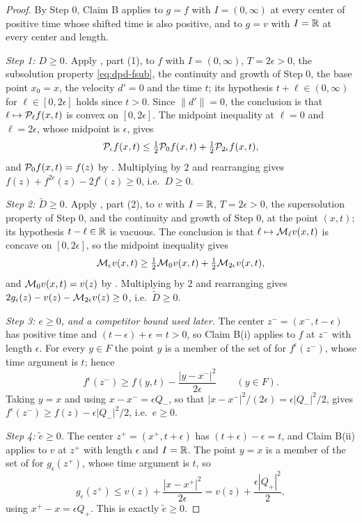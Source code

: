 \begin{proof}
By Step 0, Claim B applies to $g=f$ with $I=(0,\infty)$ at every center of
positive time whose shifted time is also positive, and to $g=v$ with $I=\mathbb{R}$ at
every center and length.

\emph{Step 1: $D\ge0$.}
Apply , part (1), to $f$ with $I=(0,\infty)$,
$T=2\epsilon>0$, the subsolution property \eqref{eq:dpd-fsub}, the continuity
and growth of Step 0, the base point $x_0=x$, the velocity $d'=0$ and the time
$t$; its hypothesis $t+\ell\in(0,\infty)$ for $\ell\in[0,2\epsilon]$ holds since
$t>0$. Since $\|d'\|=0$, the conclusion is that
$\ell\mapsto\mathcal{P}_\ell f(x,t)$ is convex on $[0,2\epsilon]$. The midpoint
inequality at $\ell=0$ and $\ell=2\epsilon$, whose midpoint is $\epsilon$,
gives
\[
  \mathcal{P}_\epsilon f(x,t)
   \le\tfrac12\mathcal{P}_0f(x,t)+\tfrac12\mathcal{P}_{2\epsilon}f(x,t),
\]
and $\mathcal{P}_0f(x,t)=f(z)$ by . Multiplying by $2$ and
rearranging gives $f(z)+f^{2\epsilon}(z)-2f^\epsilon(z)\ge0$, i.e.\ $D\ge0$.

\emph{Step 2: $\widetilde D\ge0$.}
Apply , part (2), to $v$ with $I=\mathbb{R}$,
$T=2\epsilon>0$, the supersolution property of Step 0, and the continuity and
growth of Step 0, at the point $(x,t)$; its hypothesis $t-\ell\in\mathbb{R}$ is
vacuous. The conclusion is that $\ell\mapsto\mathcal{M}_\ell v(x,t)$ is concave on
$[0,2\epsilon]$, so the midpoint inequality gives
\[
  \mathcal{M}_\epsilon v(x,t)
   \ge\tfrac12\mathcal{M}_0v(x,t)+\tfrac12\mathcal{M}_{2\epsilon}v(x,t),
\]
and $\mathcal{M}_0v(x,t)=v(z)$ by . Multiplying by $2$ and
rearranging gives $2g_\epsilon(z)-v(z)-\mathcal{M}_{2\epsilon}v(z)\ge0$, i.e.\
$\widetilde D\ge0$.

\emph{Step 3: $e\ge0$, and a competitor bound used later.}
The center $z^-=(x^-,t-\epsilon)$ has positive time and
$(t-\epsilon)+\epsilon=t>0$, so Claim B(i) applies to $f$ at $z^-$ with length
$\epsilon$. For every $y\in F$ the point $y$ is a member of the set of
\noderef{QuadEnvP} for $f^\epsilon(z^-)$, whose time argument is $t$; hence
\begin{equation}\label{eq:dpd-competitor}
  f^\epsilon(z^-)\ge f(y,t)-\frac{|y-x^-|^2}{2\epsilon}\qquad(y\in F).
\end{equation}
Taking $y=x$ and using $x-x^-=\epsilon Q_-$, so that
$|x-x^-|^2/(2\epsilon)=\epsilon|Q_-|^2/2$, gives
$f^\epsilon(z^-)\ge f(z)-\epsilon|Q_-|^2/2$, i.e.\ $e\ge0$.

\emph{Step 4: $\widetilde e\ge0$.}
The center $z^+=(x^+,t+\epsilon)$ has $(t+\epsilon)-\epsilon=t$, and Claim
B(ii) applies to $v$ at $z^+$ with length $\epsilon$ and $I=\mathbb{R}$. The point
$y=x$ is a member of the set of \noderef{QuadEnvM} for $g_\epsilon(z^+)$, whose
time argument is $t$, so
\[
  g_\epsilon(z^+)\le v(z)+\frac{|x-x^+|^2}{2\epsilon}
   =v(z)+\frac{\epsilon|Q_+|^2}{2},
\]
using $x^+-x=\epsilon Q_+$. This is exactly $\widetilde e\ge0$.


\end{proof}
